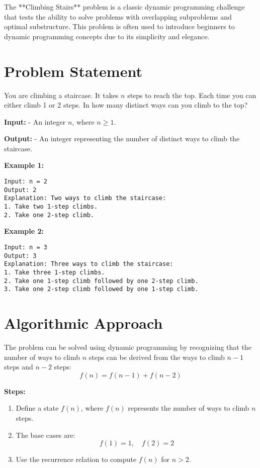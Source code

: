 
\label{problem:Climbing_Stairs}

The **Climbing Stairs** problem is a classic dynamic programming challenge that tests the ability to solve problems with overlapping subproblems and optimal substructure. This problem is often used to introduce beginners to dynamic programming concepts due to its simplicity and elegance.

\section*{Problem Statement}
You are climbing a staircase. It takes \( n \) steps to reach the top. Each time you can either climb 1 or 2 steps. In how many distinct ways can you climb to the top?

\textbf{Input:}
- An integer \( n \), where \( n \geq 1 \).

\textbf{Output:}
- An integer representing the number of distinct ways to climb the staircase.

\textbf{Example 1:}

\begin{verbatim}
Input: n = 2
Output: 2
Explanation: Two ways to climb the staircase:
1. Take two 1-step climbs.
2. Take one 2-step climb.
\end{verbatim}

\textbf{Example 2:}

\begin{verbatim}
Input: n = 3
Output: 3
Explanation: Three ways to climb the staircase:
1. Take three 1-step climbs.
2. Take one 1-step climb followed by one 2-step climb.
3. Take one 2-step climb followed by one 1-step climb.
\end{verbatim}

\section*{Algorithmic Approach}
The problem can be solved using dynamic programming by recognizing that the number of ways to climb \( n \) steps can be derived from the ways to climb \( n-1 \) steps and \( n-2 \) steps:
\[
f(n) = f(n-1) + f(n-2)
\]

\textbf{Steps:}
\begin{enumerate}
    \item Define a state \( f(n) \), where \( f(n) \) represents the number of ways to climb \( n \) steps.
    \item The base cases are:
        \[
        f(1) = 1, \quad f(2) = 2
        \]
    \item Use the recurrence relation to compute \( f(n) \) for \( n > 2 \).
\end{enumerate}

